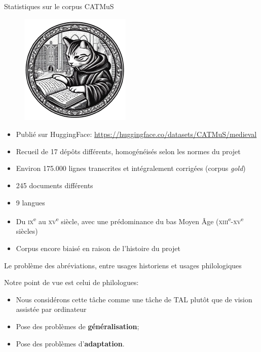 \documentclass[11pt,aspectratio=169]{beamer}
\let\cite\parencite
\begin{document}
\begin{frame}{Statistiques sur le corpus CATMuS}
\begin{figure}
    \includegraphics[width=.1\textwidth]{img/catmus.png}
\end{figure}
\begin{itemize}
\item Publié sur HuggingFace: \url{https://huggingface.co/datasets/CATMuS/medieval}
\item Recueil de 17 dépôts différents, homogénéisés selon les normes du projet
\item Environ 175.000 lignes transcrites et intégralement corrigées (corpus \textit{gold})
\item 245 documents différents
\item 9 langues
\item Du \textsc{ix}\textsuperscript{e} au \textsc{xv}\textsuperscript{e} siècle, avec une prédominance du bas Moyen Âge (\textsc{xiii}\textsuperscript{e}-\textsc{xv}\textsuperscript{e} siècles)
\item Corpus encore biaisé en raison de l'histoire du projet
\end{itemize}
\end{frame}


\begin{frame}{Le problème des abréviations, entre usages historiens et usages philologiques}

\color{black}Notre point de vue est celui de philologues:
\begin{itemize}
\item Nous considérons cette tâche comme une tâche de TAL plutôt que de vision assistée par ordinateur \cite{clerice_CATMuSMedievalMultilingual_2024a}
\item Pose des problèmes de \textbf{généralisation};
\item Pose des problèmes d'\textbf{adaptation}.
\end{itemize}
\end{frame}
\end{document}
